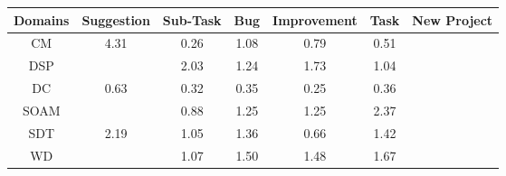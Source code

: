 \begin{tabular}{|c||c|c|c|c|c|c|}
\hline
Domains & Suggestion & Sub-Task & Bug & Improvement & Task & New Project \\ 
\hline
CM & \cellcolor[rgb]{0.53,0.66,0.42} 4.31 & \cellcolor[rgb]{0.7635455356738793,0.14678220218969518,0.283309166628954} 0.26 & \cellcolor[rgb]{0.9005387414381023,0.8355183512075222,0.42} 1.08 & \cellcolor[rgb]{0.869044192850799,0.6461425128271153,0.3817745799940791} 0.79 & \cellcolor[rgb]{0.8130572215281858,0.38113751523341277,0.32952007342630674} 0.51 &  \\ 
\hline
DSP &  & \cellcolor[rgb]{0.7915895097308236,0.7839108203988112,0.42} 2.03 & \cellcolor[rgb]{0.8822339118823402,0.8268476424705821,0.42} 1.24 & \cellcolor[rgb]{0.8265704378648135,0.800480733725438,0.42000000000000004} 1.73 & \cellcolor[rgb]{0.9058512225120255,0.8380347896109596,0.42} 1.04 &  \\ 
\hline
DC & \cellcolor[rgb]{0.8355591442333263,0.4876466160377442,0.3505218679511045} 0.63 & \cellcolor[rgb]{0.7755401970505155,0.20355693270577302,0.29450418391381444} 0.32 & \cellcolor[rgb]{0.7810346930621059,0.2295642138273014,0.2996323801912989} 0.35 & \cellcolor[rgb]{0.76,0.13,0.28} 0.25 & \cellcolor[rgb]{0.7821157913175949,0.2346814122366156,0.30064140522975524} 0.36 &  \\ 
\hline
SOAM &  & \cellcolor[rgb]{0.8851959576514812,0.7225941995503439,0.3968495604747157} 0.88 & \cellcolor[rgb]{0.8815253088623368,0.8265119884084753,0.42} 1.25 & \cellcolor[rgb]{0.8814647244841357,0.8264832905451169,0.42} 1.25 & \cellcolor[rgb]{0.7524712226513818,0.765381105466444,0.42} 2.37 &  \\ 
\hline
SDT & \cellcolor[rgb]{0.7727909666392732,0.7750062473554451,0.42} 2.19 & \cellcolor[rgb]{0.9044076261906348,0.8373509808271428,0.42} 1.05 & \cellcolor[rgb]{0.8690410555561472,0.8205983947371224,0.42} 1.36 & \cellcolor[rgb]{0.8419830009759529,0.5180528712861769,0.356517467577556} 0.66 & \cellcolor[rgb]{0.8614463320021627,0.8170008941062875,0.42} 1.42 &  \\ 
\hline
WD &  & \cellcolor[rgb]{0.9018000195514949,0.8361157987349186,0.42} 1.07 & \cellcolor[rgb]{0.8527046298210679,0.8128600878099795,0.42} 1.50 & \cellcolor[rgb]{0.8551473508466325,0.8140171661905101,0.42} 1.48 & \cellcolor[rgb]{0.8324562196112402,0.8032687356053243,0.42} 1.67 &  \\ 
\hline
\end{tabular}